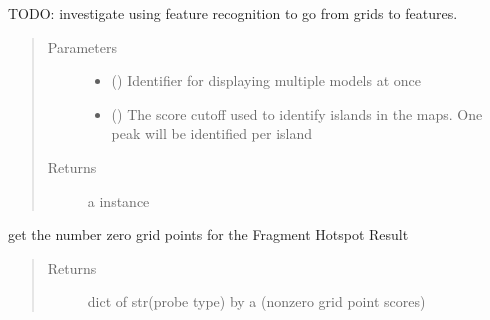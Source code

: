 \documentclass[letterpaper,10pt,english]{sphinxmanual}
\begin{document}
\begin{fulllineitems}
\begin{fulllineitems}
TODO: investigate using feature recognition to go from grids to features.
\begin{quote}\begin{description}
\item[{Parameters}] \leavevmode\begin{itemize}
\item {} 
 () \textendash{} Identifier for displaying multiple models at once

\item {} 
 () \textendash{} The score cutoff used to identify islands in the maps. One peak will be identified per island

\end{itemize}

\item[{Returns}] \leavevmode
a  instance

\end{description}\end{quote}

\end{fulllineitems}


\begin{fulllineitems}
\label{\detokenize{result_api:hotspots.result.Results.map_values}}
get the number zero grid points for the Fragment Hotspot Result
\begin{quote}\begin{description}
\item[{Returns}] \leavevmode
dict of str(probe type) by a  (non\sphinxhyphen{}zero grid point scores)

\end{description}\end{quote}

\end{fulllineitems}



\end{fulllineitems}
\end{document}
